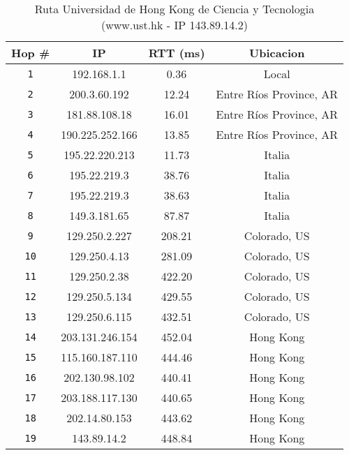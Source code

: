 \begin{table}[ht]\begin{center}
    \begin{tabular}{|c|c|c|c|}
    \hline
    \textbf{Hop \#} & \textbf{IP} & \textbf{RTT (ms)} & \textbf{Ubicacion} \\ \hline
    \texttt{1} &  192.168.1.1 & 0.36 & Local \\ \hline
    \texttt{2} &  200.3.60.192 & 12.24 & Entre Ríos Province, AR \\ \hline
    \texttt{3} &  181.88.108.18 & 16.01 & Entre Ríos Province, AR \\ \hline
    \texttt{4} &  190.225.252.166 & 13.85 & Entre Ríos Province, AR \\ \hline
    \texttt{5} &  195.22.220.213 & 11.73 & Italia \\ \hline
    \texttt{6} &  195.22.219.3 & 38.76 & Italia \\ \hline
    \texttt{7} &  195.22.219.3 & 38.63 & Italia \\ \hline
    \texttt{8} &  149.3.181.65 & 87.87 & Italia \\ \hline
    \texttt{9} &  129.250.2.227 & 208.21 & Colorado, US \\ \hline
    \texttt{10} & 129.250.4.13 & 281.09 & Colorado, US \\ \hline
    \texttt{11} & 129.250.2.38 & 422.20 & Colorado, US \\ \hline
    \texttt{12} & 129.250.5.134 & 429.55 & Colorado, US \\ \hline
    \texttt{13} & 129.250.6.115 & 432.51 & Colorado, US \\ \hline
    \texttt{14} & 203.131.246.154 & 452.04 & Hong Kong \\ \hline
    \texttt{15} & 115.160.187.110 & 444.46 & Hong Kong \\ \hline
    \texttt{16} & 202.130.98.102 & 440.41 & Hong Kong \\ \hline
    \texttt{17} & 203.188.117.130 & 440.65 & Hong Kong \\ \hline
    \texttt{18} & 202.14.80.153 & 443.62 & Hong Kong \\ \hline
    \texttt{19} & 143.89.14.2 & 448.84 & Hong Kong \\ \hline
    \end{tabular}
    \caption{Ruta Universidad de Hong Kong de Ciencia y Tecnologia (www.ust.hk  - IP 143.89.14.2)}
\end{center}
\end{table}

\begin{figure}[H]
    \centering
\end{figure}
